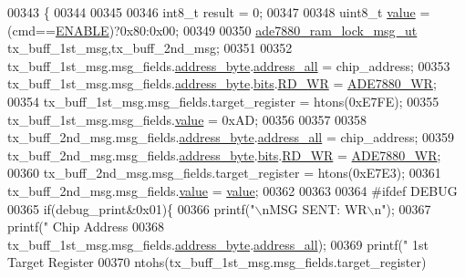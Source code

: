 \begin{DoxyCode}
00343                                                            \{
00344       
00345       
00346     int8\_t result = 0;  
00347     
00348     uint8\_t \hyperlink{a00040_a638e4503e0ae6ce655b7ad2e17e8f0ad}{value} = (cmd==\hyperlink{a00036_a514ad415fb6125ba296793df7d1a468a}{ENABLE})?0x80:0x00;
00349     
00350      \hyperlink{a00011}{ade7880\_ram\_lock\_msg\_ut} tx\_buff\_1st\_msg,tx\_buff\_2nd\_msg;
00351 
00352      tx\_buff\_1st\_msg.msg\_fields.\hyperlink{a00011_af6a65bac733ea3e9b1d24b065163d49a}{address\_byte}.\hyperlink{a00010_a7bf6defa0ae3fb2bca057a3a97d4f740}{address\_all} = chip\_address;
00353      tx\_buff\_1st\_msg.msg\_fields.\hyperlink{a00011_af6a65bac733ea3e9b1d24b065163d49a}{address\_byte}.\hyperlink{a00010_ae121725fb28cc26495969d71e0e0d42e}{bits}.\hyperlink{a00010_a97e2668c8e5470fa66185f16dc2e8045}{RD\_WR} = 
      \hyperlink{a00040_a36352e0d88dc7c5ede031013c75a678f}{ADE7880\_WR};
00354      tx\_buff\_1st\_msg.msg\_fields.target\_register = htons(0xE7FE);
00355      tx\_buff\_1st\_msg.msg\_fields.\hyperlink{a00011_a638e4503e0ae6ce655b7ad2e17e8f0ad}{value} = 0xAD;
00356      
00357      
00358      tx\_buff\_2nd\_msg.msg\_fields.\hyperlink{a00011_af6a65bac733ea3e9b1d24b065163d49a}{address\_byte}.\hyperlink{a00010_a7bf6defa0ae3fb2bca057a3a97d4f740}{address\_all} = chip\_address;
00359      tx\_buff\_2nd\_msg.msg\_fields.\hyperlink{a00011_af6a65bac733ea3e9b1d24b065163d49a}{address\_byte}.\hyperlink{a00010_ae121725fb28cc26495969d71e0e0d42e}{bits}.\hyperlink{a00010_a97e2668c8e5470fa66185f16dc2e8045}{RD\_WR} = 
      \hyperlink{a00040_a36352e0d88dc7c5ede031013c75a678f}{ADE7880\_WR};
00360      tx\_buff\_2nd\_msg.msg\_fields.target\_register = htons(0xE7E3);
00361      tx\_buff\_2nd\_msg.msg\_fields.\hyperlink{a00011_a638e4503e0ae6ce655b7ad2e17e8f0ad}{value} = \hyperlink{a00040_a638e4503e0ae6ce655b7ad2e17e8f0ad}{value};
00362      
00363 
00364 \textcolor{preprocessor}{    #ifdef DEBUG}
00365 \textcolor{preprocessor}{}       \textcolor{keywordflow}{if}(debug\_print&0x01)\{
00366        printf(\textcolor{stringliteral}{"\(\backslash\)nMSG SENT: WR\(\backslash\)n"});
00367        printf(\textcolor{stringliteral}{"       Chip Address %
00368        tx\_buff\_1st\_msg.msg\_fields.\hyperlink{a00011_af6a65bac733ea3e9b1d24b065163d49a}{address\_byte}.\hyperlink{a00010_a7bf6defa0ae3fb2bca057a3a97d4f740}{address\_all});
00369        printf(\textcolor{stringliteral}{"       1st Target Register %
00370        ntohs(tx\_buff\_1st\_msg.msg\_fields.target\_register)
}}
\end{DoxyCode}
